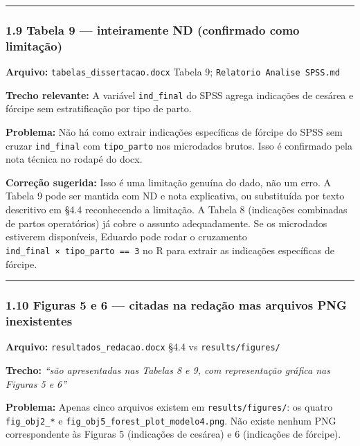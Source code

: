 \documentclass[
]{article}
\begin{document}
\begin{center}\rule{0.5\linewidth}{0.5pt}\end{center}

\hypertarget{tabela-9-inteiramente-nd-confirmado-como-limitauxe7uxe3o}{%
\subsubsection{1.9 Tabela 9 --- inteiramente ND (confirmado como
limitação)}\label{tabela-9-inteiramente-nd-confirmado-como-limitauxe7uxe3o}}

\textbf{Arquivo:} \texttt{tabelas\_dissertacao.docx} Tabela 9;
\texttt{Relatorio\ Analise\ SPSS.md}

\textbf{Trecho relevante:} A variável \texttt{ind\_final} do SPSS agrega
indicações de cesárea e fórcipe sem estratificação por tipo de parto.

\textbf{Problema:} Não há como extrair indicações específicas de fórcipe
do SPSS sem cruzar \texttt{ind\_final} com \texttt{tipo\_parto} nos
microdados brutos. Isso é confirmado pela nota técnica no rodapé do
docx.

\textbf{Correção sugerida:} Isso é uma limitação genuína do dado, não um
erro. A Tabela 9 pode ser mantida com ND e nota explicativa, ou
substituída por texto descritivo em §4.4 reconhecendo a limitação. A
Tabela 8 (indicações combinadas de partos operatórios) já cobre o
assunto adequadamente. Se os microdados estiverem disponíveis, Eduardo
pode rodar o cruzamento \texttt{ind\_final\ ×\ tipo\_parto\ ==\ 3} no R
para extrair as indicações específicas de fórcipe.

\begin{center}\rule{0.5\linewidth}{0.5pt}\end{center}

\hypertarget{figuras-5-e-6-citadas-na-redauxe7uxe3o-mas-arquivos-png-inexistentes}{%
\subsubsection{1.10 Figuras 5 e 6 --- citadas na redação mas arquivos
PNG
inexistentes}\label{figuras-5-e-6-citadas-na-redauxe7uxe3o-mas-arquivos-png-inexistentes}}

\textbf{Arquivo:} \texttt{resultados\_redacao.docx} §4.4 vs
\texttt{results/figures/}

\textbf{Trecho:} \emph{``são apresentadas nas Tabelas 8 e 9, com
representação gráfica nas Figuras 5 e 6''}

\textbf{Problema:} Apenas cinco arquivos existem em
\texttt{results/figures/}: os quatro \texttt{fig\_obj2\_*} e
\texttt{fig\_obj5\_forest\_plot\_modelo4.png}. Não existe nenhum PNG
correspondente às Figuras 5 (indicações de cesárea) e 6 (indicações de
fórcipe).
\end{document}
